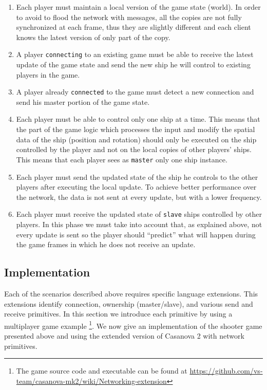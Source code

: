 \begin{enumerate}
	\item Each player must maintain a local version of the game state (world). In order to avoid to flood the network with messages, all the copies are not fully synchronized at each frame, thus they are slightly different and each client knows the latest version of only part of the copy.
	\item A player \texttt{connecting} to an existing game must be able to receive the latest update of the game state and send the new ship he will control to existing players in the game.
	\item A player already \texttt{connected} to the game must detect a new connection and send his master portion of the game state.
	\item Each player must be able to control only one ship at a time. This means that the part of the game logic which processes the input and modify the spatial data of the ship (position and rotation) should only be executed on the ship controlled by the player and not on the local copies of other players' ships. This means that each player sees as \texttt{master} only one ship instance.
	\item Each player must send the updated state of the ship he controls to the other players after executing the local update. To achieve better performance over the network, the data is not sent at every update, but with a lower frequency.
	\item Each player must receive the updated state of \texttt{slave} ships controlled by other players. In this phase we must take into account that, as explained above, not every update is sent so the player should ``predict'' what will happen during the game frames in which he does not receive an update.
\end{enumerate}

\subsection{Implementation}
Each of the scenarios described above requires specific language extensions. This extensions identify connection, ownership (master/slave), and various send and receive primitives. In this section we introduce each primitive by using a multiplayer game example \footnote{The game source code and executable can be found at \url{https://github.com/vs-team/casanova-mk2/wiki/Networking-extension}}. We now give an implementation of the shooter game presented above and using the extended version of Casanova 2 with network primitives. 


